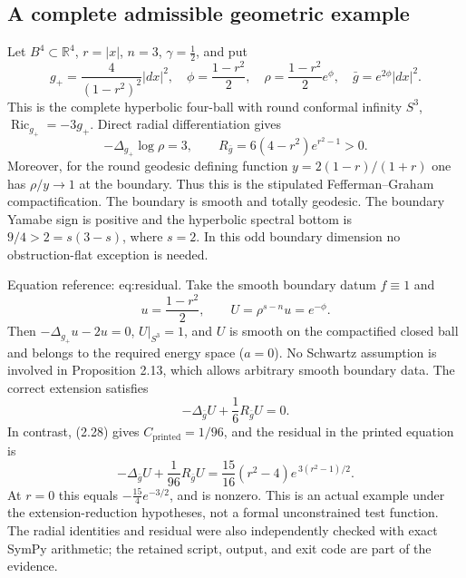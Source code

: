 \documentclass[10pt]{article}
\begin{document}
\subsection*{A complete admissible geometric example}
Let \(B^4\subset\mathbb R^4\), \(r=|x|\), \(n=3\), \(\gamma=\tfrac12\), and put \[g_+=\frac{4}{(1-r^2)^2}|dx|^2,\quad
 \phi=\frac{1-r^2}{2},\quad
 \rho=\frac{1-r^2}{2}e^\phi,\quad
 \bar g=e^{2\phi}|dx|^2.\] This is the complete hyperbolic four-ball with round conformal infinity \(S^3\), \(\operatorname{Ric}_{g_+}=-3g_+\). Direct radial differentiation gives \[-\Delta_{g_+}\log\rho=3,\qquad
 R_{\bar g}=6(4-r^2)e^{r^2-1}>0.\] Moreover, for the round geodesic defining function \(y=2(1-r)/(1+r)\) one has \(\rho/y\to1\) at the boundary. Thus this is the stipulated Fefferman–Graham compactification. The boundary is smooth and totally geodesic. The boundary Yamabe sign is positive and the hyperbolic spectral bottom is \(9/4>2=s(3-s)\), where \(s=2\). In this odd boundary dimension no obstruction-flat exception is needed.\par
Equation reference: eq:residual. Take the smooth boundary datum \(f\equiv1\) and \[u=\frac{1-r^2}{2},\qquad U=\rho^{s-n}u=e^{-\phi}.\] Then \(-\Delta_{g_+}u-2u=0\), \(U|_{S^3}=1\), and \(U\) is smooth on the compactified closed ball and belongs to the required energy space (\(a=0\)). No Schwartz assumption is involved in Proposition 2.13, which allows arbitrary smooth boundary data. The correct extension satisfies \[-\Delta_{\bar g}U+\frac16 R_{\bar g}U=0.\] In contrast, (2.28) gives \(C_{\mathrm{printed}}=1/96\), and the residual in the printed equation is \[
 -\Delta_{\bar g}U+\frac1{96}R_{\bar g}U
 =\frac{15}{16}(r^2-4)e^{\,3(r^2-1)/2}.\] At \(r=0\) this equals \(-\tfrac{15}{4}e^{-3/2}\), and is nonzero. This is an actual example under the extension-reduction hypotheses, not a formal unconstrained test function. The radial identities and residual were also independently checked with exact SymPy arithmetic; the retained script, output, and exit code are part of the evidence.\par
\end{document}
